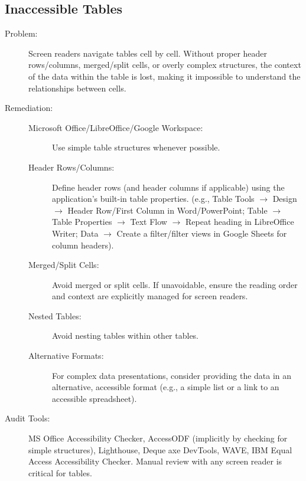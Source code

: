 \subsection{Inaccessible Tables}
\label{subsec:inaccessible-tables}
\begin{description}
    \item[Problem:] Screen readers navigate tables cell by cell. Without proper header rows/columns, merged/split cells, or overly complex structures, the context of the data within the table is lost, making it impossible to understand the relationships between cells.
    \item[Remediation:]
    \begin{description}
        \item[Microsoft Office/LibreOffice/Google Workspace:] Use simple table structures whenever possible.
        \item[Header Rows/Columns:] Define header rows (and header columns if applicable) using the application's built-in table properties. (e.g., Table Tools $\rightarrow$ Design $\rightarrow$ Header Row/First Column in Word/PowerPoint; Table $\rightarrow$ Table Properties $\rightarrow$ Text Flow $\rightarrow$ Repeat heading in LibreOffice Writer; Data $\rightarrow$ Create a filter/filter views in Google Sheets for column headers).
        \item[Merged/Split Cells:] Avoid merged or split cells. If unavoidable, ensure the reading order and context are explicitly managed for screen readers.
        \item[Nested Tables:] Avoid nesting tables within other tables.
        \item[Alternative Formats:] For complex data presentations, consider providing the data in an alternative, accessible format (e.g., a simple list or a link to an accessible spreadsheet).
    \end{description}
    \item[Audit Tools:] MS Office Accessibility Checker, AccessODF (implicitly by checking for simple structures), Lighthouse, Deque axe DevTools, WAVE, IBM Equal Access Accessibility Checker. Manual review with any screen reader is critical for tables.
\end{description}


